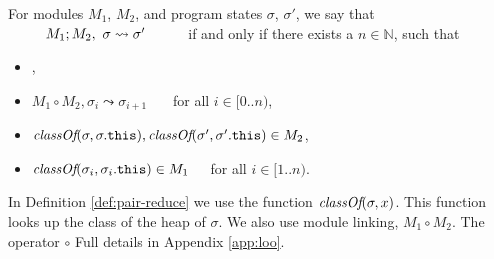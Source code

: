 \begin{definition}
\label{def:pair-reduce}
For  
  modules $M_1$,  $M_2$, and program states $\sigma$, $\sigma'$, 
we say that $\ \ \ \ \ \ \ \ \reduction{M_1}{M_2}{\sigma}{\sigma'}\ \ \ \ \ \ \ \ $ if and only if there exists a 
$n\in\mathbb{N}$, such that
\begin{itemize}
\item
{},
\item
$M_1 \circ M_2, \sigma_i \leadsto \sigma_{i+1}$  \ \ \ for all $i\in [0..n)$,
\item
$\textit{classOf}(\sigma, \sigma.{\texttt{this}}), \textit{classOf}(\sigma', \sigma'.{\texttt{this}})\in M_2$,
\item
$\textit{classOf}(\sigma_i, \sigma_i.{\texttt{this}}) \in M_1$\ \ \ for all $i\in [1..n)$.
\end{itemize} 
%
\end{definition}
In Definition \ref{def:pair-reduce}  %
we  use  the function
$\textit{classOf}(\sigma, x)$. This function looks up 
the class of   the  heap of $\sigma$. 
We also use module linking, $M_1\circ M_2$. The operator $\circ$
Full details in  Appendix \ref{app:loo}.

